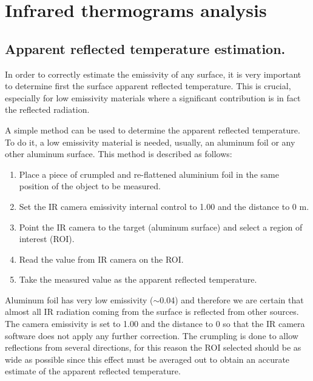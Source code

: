 \pagestyle{standard}

\chapter{Infrared thermograms analysis}\label{chapter3}

	\thispagestyle{chapter-first-page}

	\section{Apparent reflected temperature estimation.}\label{section3.1}
	
		In order to correctly estimate the emissivity of any surface, it is very important to determine first the surface apparent reflected temperature. This is crucial, especially for low emissivity materials where a significant contribution is in fact the reflected radiation.
		
		A simple method can be used to determine the apparent reflected temperature. To do it, a low emissivity material is needed, usually, an aluminum foil or any other aluminum surface. This method is described as follows:
		
		\begin{enumerate}[label={\arabic*)}]
			\item Place a piece of crumpled and re-flattened aluminium foil in the same position of the object to be measured.
			\item Set the IR camera emissivity internal control to 1.00 and the distance to 0 m.
			\item Point the IR camera to the target (aluminum surface) and select a region of interest (ROI).
			\item Read the value from IR camera on the ROI.
			\item Take the measured value as the apparent reflected temperature.
		\end{enumerate}
	
		Aluminum foil has very low emissivity ($\sim$0.04) and therefore we are certain that almost all IR radiation coming from the surface is reflected from other sources. The camera emissivity is set to 1.00 and the distance to 0 so that the IR camera software does not apply any further correction. The crumpling is done to allow reflections from several directions, for this reason the ROI selected should be as wide as possible since this effect must be averaged out to obtain an accurate estimate of the apparent reflected temperature.\bigskip
	
